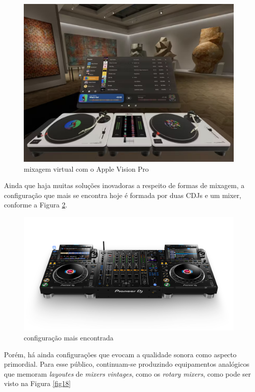 \begin{figure}[h]
	\centering
    \includegraphics[scale=0.3]{figuras/fig16.eps}
	\caption{mixagem virtual com o Apple Vision Pro}
	\label{fig16}
\end{figure}

Ainda que haja muitas soluções inovadoras a respeito de formas de mixagem, a configuração que mais se encontra hoje é formada por duas CDJs e um mixer, conforme a Figura \ref{fig17}.

\begin{figure}[h]
	\centering
    \includegraphics[scale=0.3]{figuras/fig17.png}
	\caption{configuração mais encontrada}
	\label{fig17}
\end{figure}

Porém, há ainda configurações que evocam a qualidade sonora como aspecto primordial. Para esse público, continuam-se produzindo equipamentos analógicos que memoram \textit{layoutes} de \textit{mixers} \textit{vintages}, como os \textit{rotary mixers}, como pode ser visto na Figura \ref{fig18}

